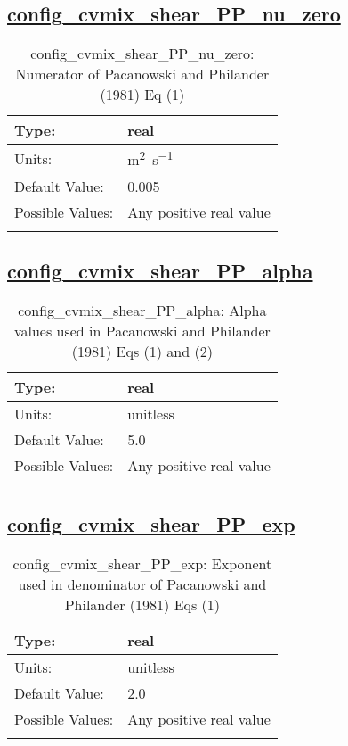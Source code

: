 \subsection[config\_cvmix\_shear\_PP\_nu\_zero]{\hyperref[sec:nm_tab_cvmix]{config\_cvmix\_shear\_PP\_nu\_zero}}
\label{subsec:nm_sec_config_cvmix_shear_PP_nu_zero}
\begin{center}
\begin{longtable}{| p{2.0in} || p{4.0in} |}
    \hline
    Type: & real \\
    \hline
    Units: & \si{m^2.s^{-1}} \\
    \hline
    Default Value: & 0.005 \\
    \hline
    Possible Values: & Any positive real value \\
    \hline
    \caption{config\_cvmix\_shear\_PP\_nu\_zero: Numerator of Pacanowski and Philander (1981) Eq (1)}
\end{longtable}
\end{center}
\subsection[config\_cvmix\_shear\_PP\_alpha]{\hyperref[sec:nm_tab_cvmix]{config\_cvmix\_shear\_PP\_alpha}}
\label{subsec:nm_sec_config_cvmix_shear_PP_alpha}
\begin{center}
\begin{longtable}{| p{2.0in} || p{4.0in} |}
    \hline
    Type: & real \\
    \hline
    Units: & \si{unitless} \\
    \hline
    Default Value: & 5.0 \\
    \hline
    Possible Values: & Any positive real value \\
    \hline
    \caption{config\_cvmix\_shear\_PP\_alpha: Alpha values used in Pacanowski and Philander (1981) Eqs (1) and (2)}
\end{longtable}
\end{center}
\subsection[config\_cvmix\_shear\_PP\_exp]{\hyperref[sec:nm_tab_cvmix]{config\_cvmix\_shear\_PP\_exp}}
\label{subsec:nm_sec_config_cvmix_shear_PP_exp}
\begin{center}
\begin{longtable}{| p{2.0in} || p{4.0in} |}
    \hline
    Type: & real \\
    \hline
    Units: & \si{unitless} \\
    \hline
    Default Value: & 2.0 \\
    \hline
    Possible Values: & Any positive real value \\
    \hline
    \caption{config\_cvmix\_shear\_PP\_exp: Exponent used in denominator of Pacanowski and Philander (1981) Eqs (1)}
\end{longtable}
\end{center}
